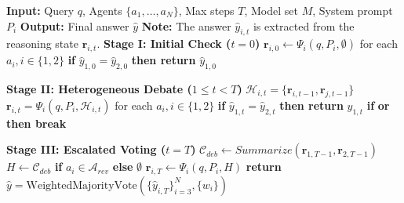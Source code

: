 \documentclass[11pt]{article}
\begin{document}
\begin{algorithm}[]
    \caption{HCP-MAD Framework}
    \label{alg:HCP-MAD-compact}
    \small %
    \begin{algorithmic}[1]
        \STATE \textbf{Input:} Query $q$, Agents $\{a_1, \dots, a_N\}$, Max steps $T$, Model set $M$, System prompt $P_i$
         \STATE \textbf{Output:} Final answer $\hat{y}$
        \STATE \textbf{Note:} The answer $\hat{y}_{i,t}$ is extracted from the reasoning state $\boldsymbol{r}_{i,t}$.
        \STATE \textbf{Stage I: Initial Check ($t=0$)}
        \STATE $\boldsymbol{r}_{i,0} \gets \Psi_i(q, P_i, \emptyset)$ for each $a_i, i \in \{1, 2\}$
         \STATE \textbf{if} $\hat{y}_{1,0} = \hat{y}_{2,0}$ \textbf{then return} $\hat{y}_{1,0}$
        
        \STATE \textbf{Stage II: Heterogeneous Debate ($1 \le t < T$)}
            \STATE $\mathcal{H}_{i,t} = \{\boldsymbol{r}_{i,t-1}, \boldsymbol{r}_{j,t-1}\}$ 
            \STATE $\boldsymbol{r}_{i,t} = \Psi_i(q, P_i, \mathcal{H}_{i,t})$ for each $a_i,
            i \in \{1, 2\}$          
            \STATE \textbf{if} $\hat{y}_{1,t} = \hat{y}_{2,t}$ \textbf{then return} $\hat{y}_{1,t}$ %
            \STATE \textbf{if}  \textbf{or}  \textbf{then break} %
        \ENDFOR
        
        \STATE \textbf{Stage III: Escalated Voting ($t=T$)}
        \STATE $\mathcal{C}_{deb} \gets Summarize(\boldsymbol{r}_{1,T-1},\boldsymbol{r}_{2,T-1})$
            \STATE $H \gets \mathcal{C}_{deb}$ \textbf{if} $a_i \in \mathcal{A}_{rev}$ \textbf{else} $\emptyset$
            \STATE $\boldsymbol{r}_{i,T} \gets \Psi_i(q, P_{i}, H)$
        \ENDFOR
        \STATE \textbf{return} $\hat{y} = \text{WeightedMajorityVote}(\{\hat{y}_{i,T}\}_{i=3}^N, \{w_i\})$
    \end{algorithmic}
\end{algorithm}
\end{document}
